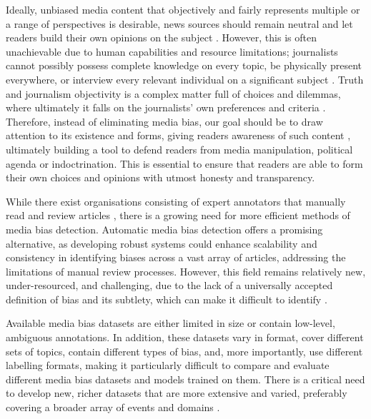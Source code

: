Ideally, unbiased media content that objectively and fairly represents multiple or a range of perspectives is desirable, news sources should remain neutral and let readers build their own opinions on the subject \cite{reuters-2021-digital-news-report}. However, this is often unachievable due to human capabilities and resource limitations; journalists cannot possibly possess complete knowledge on every topic, be physically present everywhere, or interview every relevant individual on a significant subject \cite{allsides-2022-bias-definition}. Truth and journalism objectivity is a complex matter full of choices and dilemmas, where ultimately it falls on the journalists' own preferences and criteria \cite{boudana-2011-journalistic-objectivity}. Therefore, instead of eliminating media bias, our goal should be to draw attention to its existence and forms, giving readers awareness of such content \cite{spinde-2024-taxonomy}, ultimately building a tool to defend readers from media manipulation, political agenda or indoctrination. This is essential to ensure that readers are able to form their own choices and opinions with utmost honesty and transparency.

While there exist organisations consisting of expert annotators that manually read and review articles \cite{adfontes, allsides, mbfc}, there is a growing need for more efficient methods of media bias detection. Automatic media bias detection offers a promising alternative, as developing robust systems could enhance scalability and consistency in identifying biases across a vast array of articles, addressing the limitations of manual review processes. However, this field remains relatively new, under-resourced, and challenging, due to the lack of a universally accepted definition of bias and its subtlety, which can make it difficult to identify \cite{rodrigo-2024-systematic-review-media-bias}.

Available media bias datasets \cite{spinde-2021-babe,fan-2019-basil,chen-2020-nlpcss,spinde-2023-bat,gruppi-2023-nelagt2022} are either limited in size or contain low-level, ambiguous annotations. In addition, these datasets vary in format, cover different sets of topics, contain different types of bias, and, more importantly, use different labelling formats, making it particularly difficult to compare and evaluate different media bias datasets and models trained on them. There is a critical need to develop new, richer datasets that are more extensive and varied, preferably covering a broader array of events and domains \cite{rodrigo-2024-systematic-review-media-bias}.

